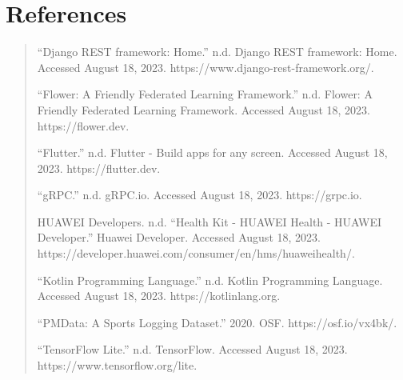 \documentclass{article}
\begin{document}
\section{References}
\begin{quote}

``Django REST framework: Home.'' n.d. Django REST framework: Home.
Accessed August 18, 2023. https://www.django-rest-framework.org/.

``Flower: A Friendly Federated Learning Framework.'' n.d. Flower: A
Friendly Federated Learning Framework. Accessed August 18, 2023.
https://flower.dev.

``Flutter.'' n.d. Flutter - Build apps for any screen. Accessed August
18, 2023. https://flutter.dev.

``gRPC.'' n.d. gRPC.io. Accessed August 18, 2023. https://grpc.io.

HUAWEI Developers. n.d. ``Health Kit - HUAWEI Health - HUAWEI
Developer.'' Huawei Developer. Accessed August 18, 2023.
https://developer.huawei.com/consumer/en/hms/huaweihealth/.

``Kotlin Programming Language.'' n.d. Kotlin Programming Language.
Accessed August 18, 2023. https://kotlinlang.org.

``PMData: A Sports Logging Dataset.'' 2020. OSF. https://osf.io/vx4bk/.

``TensorFlow Lite.'' n.d. TensorFlow. Accessed August 18, 2023.
https://www.tensorflow.org/lite.
\end{quote}
\end{document}
